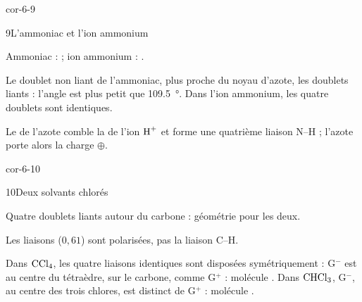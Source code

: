 \begin{blocLivre}{cor-6-9}
\begin{corrige}{9}{L'ammoniac et l'ion ammonium}
\begin{questions}
\item {} \qquad {}
\item Ammoniac :  ; ion ammonium : .
\item Le doublet non liant de l'ammoniac, plus proche du noyau d'azote,  les doublets liants : l'angle
est plus petit que \qty{109,5}{\degree}. Dans l'ion ammonium, les quatre doublets sont identiques.
\item Le  de l'azote comble la  de l'ion $\ce{H+}$ et forme une quatrième liaison N--H ; l'azote
porte alors la charge $\oplus$.
\end{questions}
\end{corrige}
\end{blocLivre}
\begin{blocLivre}{cor-6-10}
\begin{corrige}{10}{Deux solvants chlorés}
\begin{questions}
\item {} \qquad
{}
\item Quatre doublets liants autour du carbone : géométrie  pour les deux.
\item Les liaisons  ($0{,}61$) sont polarisées, pas la liaison C--H.
\item Dans $\ce{CCl4}$, les quatre liaisons identiques sont disposées symétriquement : G$^{-}$ est au centre du tétraèdre, sur le
carbone, comme G$^{+}$ : molécule . Dans $\ce{CHCl3}$, G$^{-}$, au centre des trois chlores, est distinct de G$^{+}$ :
molécule .
\end{questions}
\end{corrige}
\end{blocLivre}
